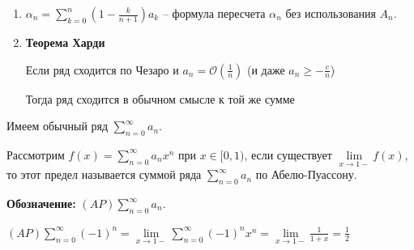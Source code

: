 \begin{remark}
    \begin{enumerate}
        \item {




            $\alpha_n = \sum\limits_{k=0}^{n} \left( 1 - \frac{k}{n + 1} \right) a_k$ -- формула пересчета $\alpha_n$ без использования $A_n$.
        }
        \item {
            \textbf{Теорема Харди}

            Если ряд сходится по Чезаро и $a_n = \mathcal{O} \left(\frac{1}{n} \right)$ (и даже $a_n \geqslant -\frac{c}{n}$)

            Тогда ряд сходится в обычном смысле к той же сумме
        }
    \end{enumerate}
\end{remark}

\begin{definition}
    Имеем обычный ряд $\sum\limits_{n=0}^\infty a_n$. 
    
    Рассмотрим $f(x) = \sum\limits_{n=0}^\infty a_n x^n$ при $x \in [0, 1)$, если существует $\lim\limits_{x \to 1-} f(x)$, то этот предел называется суммой ряда $\sum\limits_{n=0}^\infty a_n$ по Абелю-Пуассону.

    \textbf{Обозначение:} $(AP) \sum\limits_{n=0}^\infty a_n$.
\end{definition}

\begin{example}
    $(AP) \sum\limits_{n=0}^\infty (-1)^n = \lim\limits_{x \to 1-} \sum\limits_{n=0}^\infty (-1)^n x^n = \lim\limits_{x\to 1-} \frac{1}{1 + x} = \frac{1}{2}$
\end{example}

